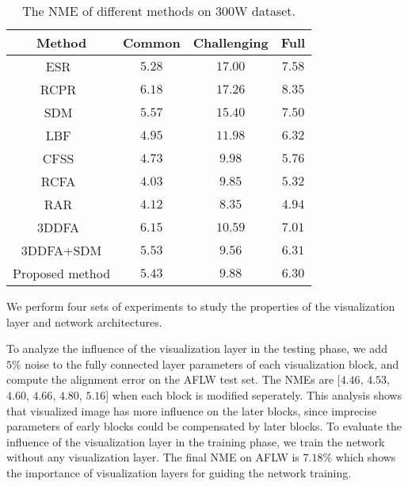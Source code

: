 \begin{table}[t!]\small
\caption{The NME of different methods on $300$W dataset.}
\begin{center}
\begin{tabular}{ c|c|c|c } 
 \hline
 Method & Common & Challenging & Full \\ 
 \hline
 ESR~\cite{cao2014face} & $5.28$ & $17.00$ & $7.58$ \\
 RCPR~\cite{burgos2013robust} & $6.18$ & $17.26$ & $8.35$ \\
 SDM~\cite{xiong2013supervised} & $5.57$ & $15.40$ & $7.50$ \\
 LBF~\cite{ren2014face} & $4.95$ & $11.98$ & $6.32$ \\
 CFSS~\cite{zhu2015face} & $4.73$ & $9.98$ & $5.76$ \\
 RCFA~\cite{wang2016recurrent} & $4.03$ & $9.85$ & $5.32$ \\
 RAR~\cite{xiao2016robust} & $4.12$ & $8.35$ & $4.94$ \\
 3DDFA~\cite{zhu2015face} & $6.15$ & $10.59$ & $7.01$ \\
 3DDFA+SDM & $5.53$ & $9.56$ & $6.31$ \\
 \hline  
 Proposed method & $5.43$ & $9.88$ & $6.30$ \\
\hline  
\end{tabular}
\end{center}
\label{table:300WRes}\vspace{-10mm}
\end{table}



\vspace{-2mm}
\vspace{-2mm}
We perform four sets of experiments to study the properties of the visualization layer and network architectures. 


To analyze the influence of the visualization layer in the testing phase, we add $5\%$ noise to the fully connected layer parameters of each visualization block, and compute the alignment error on the AFLW test set. 
The NMEs are [$4.46$, $4.53$, $4.60$, $4.66$, $4.80$, $5.16$] when each block is modified seperately. 
This analysis shows that visualized image has more influence on the later blocks, since imprecise parameters of early blocks could be compensated by later blocks. 
To evaluate the influence of the visualization layer in the training phase, we train the network without any visualization layer. 
The final NME on AFLW is $7.18\%$ which shows the importance of visualization layers for guiding the network training.

